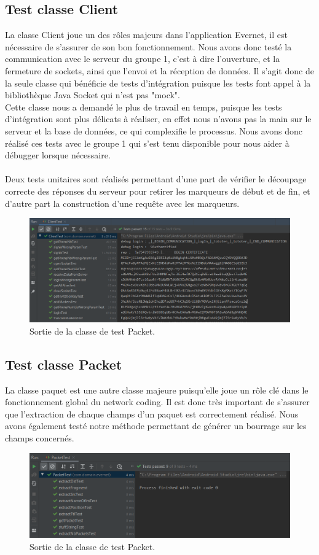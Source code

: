 \subsection{Test classe Client}
La classe Client joue un des rôles majeurs dans l'application Evernet, il est nécessaire de s'assurer de son bon fonctionnement. Nous avons donc testé la communication avec le serveur du groupe 1, c'est à dire l'ouverture, et la fermeture de sockets, ainsi que l'envoi et la réception de données. Il s'agit donc de la seule classe qui bénéficie de tests d'intégration puisque les tests font appel à la bibliothèque Java Socket qui n'est pas "mock".
\\
Cette classe nous a demandé le plus de travail en temps, puisque les tests d'intégration sont plus délicats à réaliser, en effet nous n'avons pas la main sur le serveur et la base de données, ce qui complexifie le processus. Nous avons donc réalisé ces tests avec le groupe 1 qui s'est tenu disponible pour nous aider à débugger lorsque nécessaire.
\\
\\
Deux tests unitaires sont réalisés permettant d'une part de vérifier le découpage correcte des réponses du serveur pour retirer les marqueurs de début et de fin, et d'autre part la construction d'une requête avec les marqueurs.
\begin{figure}[H]
    \includegraphics[width=18cm]{images/clientTestOutput.png}
    \caption{Sortie de la classe de test Packet.}
\end{figure}



\subsection{Test classe Packet}
La classe paquet est une autre classe majeure puisqu'elle joue un rôle clé dans le fonctionnement global du network coding. Il est donc très important de s'assurer que l'extraction de chaque champs d'un paquet est correctement réalisé. Nous avons également testé notre méthode permettant de générer un bourrage sur les champs concernés.

\begin{figure}[H]
    \includegraphics[width=18cm]{images/packetTestOutput.png}
    \caption{Sortie de la classe de test Packet.}
\end{figure}
